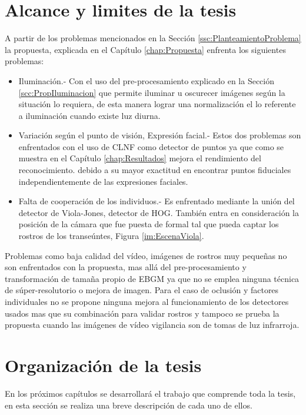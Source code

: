\section{Alcance y limites de la tesis}
A partir de los problemas mencionados en la Sección \ref{ssc:PlanteamientoProblema} la propuesta, explicada en el Capítulo \ref{chap:Propuesta} enfrenta los siguientes problemas:
\begin{itemize}
 \item Iluminación.- Con el uso del pre-procesamiento explicado en la Sección \ref{scc:PropIluminacion} que permite iluminar u oscurecer imágenes según  la situación lo requiera, de esta manera lograr una normalización el lo referente a iluminación cuando existe luz diurna.
 \item Variación según el punto de visión, Expresión facial.- Estos dos problemas son enfrentados con el uso de \ac{CLNF} como detector de puntos ya que como se muestra en el Capítulo \ref{chap:Resultados} mejora el rendimiento del reconocimiento. debido a su mayor exactitud en encontrar puntos fiduciales independientemente de las expresiones faciales.
\item Falta de cooperación de los individuos.- Es enfrentado mediante la unión del detector de Viola-Jones, detector de \ac{HOG}. También entra en consideración la posición de la cámara que fue puesta de formal tal que pueda captar los rostros de los transeúntes, Figura \ref{im:EscenaViola}.
\end{itemize}

Problemas como baja calidad del vídeo, imágenes de rostros muy pequeñas no son enfrentados con la propuesta, mas allá del pre-procesamiento y transformación de tamaña propio de \ac{EBGM} ya que no se emplea ninguna técnica de súper-resolutorio o mejora de imagen. Para el caso de oclusión y factores individuales no se propone ninguna mejora al funcionamiento de los detectores usados mas que su combinación para validar rostros y tampoco se prueba la propuesta cuando las imágenes de vídeo vigilancia  son de tomas de luz infrarroja.

\section{Organización de la tesis}
En los próximos capítulos se desarrollará el trabajo que comprende toda la tesis, en esta sección se realiza una breve descripción de cada uno de ellos.

